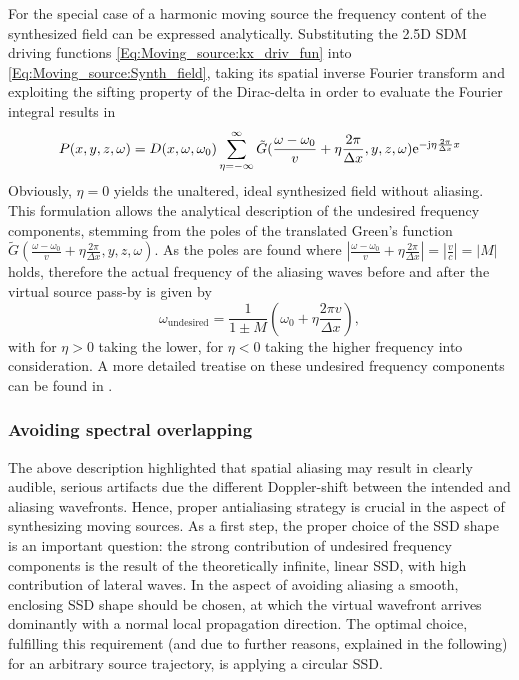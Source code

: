 For the special case of a harmonic moving source the frequency content of the synthesized field can be expressed analytically.
Substituting the 2.5D SDM driving functions \eqref{Eq:Moving_source:kx_driv_fun} into \eqref{Eq:Moving_source:Synth_field}, taking its spatial inverse Fourier transform and exploiting the sifting property of the Dirac-delta in order to evaluate the Fourier integral results in
\begin{equation}
P(x,y,z,\omega) = 
D(x,\omega,\omega_0)
\sum_{\eta = -\infty}^{\infty}
\tilde{G}( \frac{\omega-\omega_0}{v} +  \eta \frac{2\pi}{\Delta x},y,z, \omega )
 \mathrm{e}^{-\mathrm{j}  \eta \frac{2\pi}{\Delta x}  x}
\end{equation}
Obviously, $\eta = 0$ yields the unaltered, ideal synthesized field without aliasing.
This formulation allows the analytical description of the undesired frequency components, stemming from the poles of the translated Green's function $\tilde{G}( \frac{\omega-\omega_0}{v} +  \eta \frac{2\pi}{\Delta x},y,z, \omega )$.
As the poles are found where $|\frac{\omega-\omega_0}{v} +  \eta \frac{2\pi}{\Delta x}| = |\frac{v}{c}| = |M|$ holds, therefore the actual frequency of the aliasing waves before and after the virtual source pass-by is given by
\begin{equation}
\omega_{\mathrm{undesired}} = \frac{1}{1 \pm M} \left( \omega_0 + \eta \frac{2\pi v}{\Delta x} \right),
\end{equation}
with for $\eta > 0$ taking the lower, for $\eta < 0$ taking the higher frequency into consideration.
A more detailed treatise on these undesired frequency components can be found in \cite{firtha2016:daga}.

\subsubsection{Avoiding spectral overlapping}
The above description highlighted that spatial aliasing may result in clearly audible, serious artifacts due the different Doppler-shift between the intended and aliasing wavefronts.
Hence, proper antialiasing strategy is crucial in the aspect of synthesizing moving sources.
As a first step, the proper choice of the SSD shape is an important question: the strong contribution of undesired frequency components is the result of the theoretically infinite, linear SSD, with high contribution of lateral waves.
In the aspect of avoiding aliasing a smooth, enclosing SSD shape should be chosen, at which the virtual wavefront arrives dominantly with a normal local propagation direction.
The optimal choice, fulfilling this requirement (and due to further reasons, explained in the following) for an arbitrary source trajectory, is applying a circular SSD.

